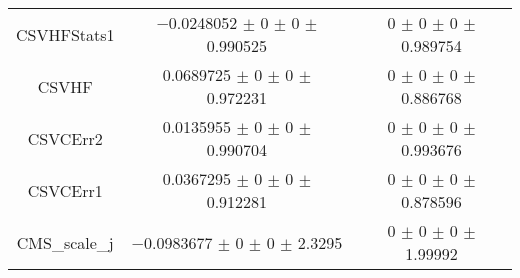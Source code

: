 \begin{table}
\begin{tabular}{ccc}
CSVHFStats1 	& \num{-0.0248052} $\pm$ \num{0} $\pm$ \num{0} $\pm$ \num{0.990525} 	& \num{0} $\pm$ \num{0} $\pm$ \num{0} $\pm$ \num{0.989754}\\
CSVHF 	& \num{0.0689725} $\pm$ \num{0} $\pm$ \num{0} $\pm$ \num{0.972231} 	& \num{0} $\pm$ \num{0} $\pm$ \num{0} $\pm$ \num{0.886768}\\
CSVCErr2 	& \num{0.0135955} $\pm$ \num{0} $\pm$ \num{0} $\pm$ \num{0.990704} 	& \num{0} $\pm$ \num{0} $\pm$ \num{0} $\pm$ \num{0.993676}\\
CSVCErr1 	& \num{0.0367295} $\pm$ \num{0} $\pm$ \num{0} $\pm$ \num{0.912281} 	& \num{0} $\pm$ \num{0} $\pm$ \num{0} $\pm$ \num{0.878596}\\
CMS\_scale\_j 	& \num{-0.0983677} $\pm$ \num{0} $\pm$ \num{0} $\pm$ \num{2.3295} 	& \num{0} $\pm$ \num{0} $\pm$ \num{0} $\pm$ \num{1.99992}\\
\bottomrule
\end{tabular}
\end{table}